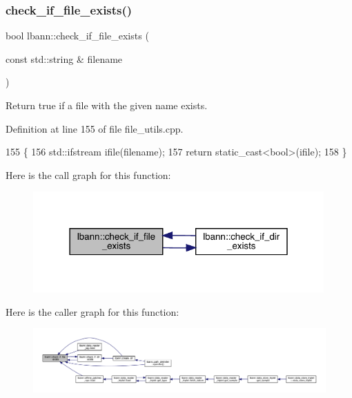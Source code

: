 \subsubsection{\texorpdfstring{check\+\_\+if\+\_\+file\+\_\+exists()}{check\_if\_file\_exists()}}
{\footnotesize\ttfamily bool lbann\+::check\+\_\+if\+\_\+file\+\_\+exists (\begin{DoxyParamCaption}\item[{const std\+::string \&}]{filename }\end{DoxyParamCaption})}



Return true if a file with the given name exists. 



Definition at line 155 of file file\+\_\+utils.\+cpp.


\begin{DoxyCode}
155                                                      \{
156   std::ifstream ifile(filename);
157   \textcolor{keywordflow}{return} \textcolor{keyword}{static\_cast<}\textcolor{keywordtype}{bool}\textcolor{keyword}{>}(ifile);
158 \}
\end{DoxyCode}
Here is the call graph for this function\+:\nopagebreak
\begin{figure}[H]
\begin{center}
\leavevmode
\includegraphics[width=316pt]{namespacelbann_a4fac6c6483965395fa79d31061485f9f_cgraph}
\end{center}
\end{figure}
Here is the caller graph for this function\+:\nopagebreak
\begin{figure}[H]
\begin{center}
\leavevmode
\includegraphics[width=350pt]{namespacelbann_a4fac6c6483965395fa79d31061485f9f_icgraph}
\end{center}
\end{figure}
\mbox{\label{namespacelbann_a38dd30b2ae8214f6595708264369ddb8}} 
